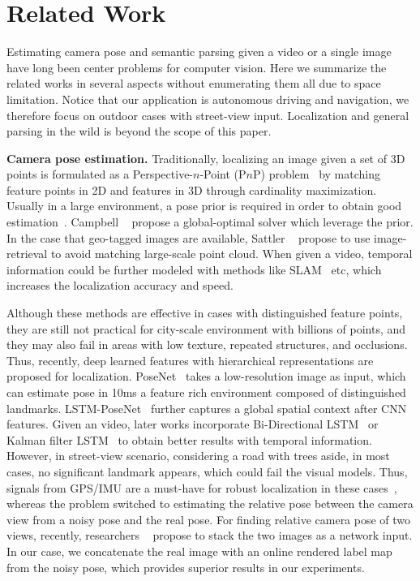 \vspace{-0.6\baselineskip}
\section{Related Work}
\vspace{-0.5\baselineskip}
\label{sec:related_work}
Estimating camera pose and semantic parsing given a video or a single image have long been center problems for computer vision.
Here we summarize the related works in several aspects without enumerating them all due to space limitation.
Notice that our application is autonomous driving and navigation, we therefore focus on outdoor cases with street-view input. 
Localization and general parsing in the wild is beyond the scope of this paper.

\textbf{Camera pose estimation.} Traditionally, localizing an image given a set of 3D points is formulated as a Perspective-$n$-Point (P$n$P) problem~\cite{haralick1994review,kneip2014upnp} by matching feature points in 2D and features in 3D through cardinality maximization. Usually in a large environment, a pose prior is required in order to obtain good estimation~\cite{david2004softposit,moreno2008pose}. Campbell \etal~\cite{campbell2017globally} propose a global-optimal solver which leverage the prior. In the case that geo-tagged images are available, Sattler \etal~\cite{sattler2017large} propose to use image-retrieval to avoid matching large-scale point cloud.
When given a video, temporal information could be further modeled with methods like SLAM~\cite{engel2014lsd} etc, which increases the localization accuracy and speed.

Although these methods are effective in cases with distinguished feature points, they are still not practical for city-scale environment with billions of points, and they may also fail in areas with low texture, repeated structures, and occlusions.
Thus, recently, deep learned features with hierarchical representations are proposed for localization. PoseNet~\cite{Kendall_2015_ICCV,kendall2017geometric} takes a low-resolution image as input, which can estimate pose in 10ms \wrt a feature rich environment composed of distinguished landmarks. LSTM-PoseNet~\cite{hazirbasimage} further captures a global spatial context after CNN features.
Given an video, later works incorporate Bi-Directional LSTM~\cite{DBLP:journals/corr/ClarkWMTW17} or Kalman filter LSTM~\cite{coskun2017long} to obtain better results with temporal information. However, in street-view scenario, considering a road with trees aside, in most cases, no significant landmark appears, which could fail the visual models. Thus, signals from GPS/IMU are a must-have for robust localization in these cases~\cite{vishal2015accurate}, whereas the problem switched to estimating the relative pose between the camera view from a noisy pose and the real pose. For finding relative camera pose of two views, recently, researchers ~\cite{laskar2017camera,ummenhofer2016demon} propose to stack the two images as a network input. In our case, we concatenate the real image with an online rendered label map from the noisy pose, which provides superior results in our experiments.

